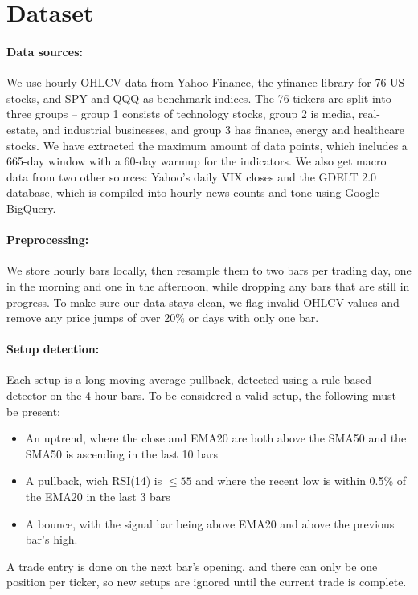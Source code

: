 \documentclass[11pt]{article}
\begin{document}
\section{Dataset}

\paragraph{Data sources:} We use hourly OHLCV data from Yahoo Finance, the yfinance library for 76 US stocks, and SPY and QQQ as benchmark indices. The 76 tickers are split into three groups -- group 1 consists of technology stocks, group 2 is media, real-estate, and industrial businesses, and group 3 has finance, energy and healthcare stocks. We have extracted the maximum amount of data points, which includes a 665-day window with a 60-day warmup for the indicators. We also get macro data from two other sources: Yahoo's daily VIX closes and the GDELT 2.0 database, which is compiled into hourly news counts and tone using Google BigQuery.

\paragraph{Preprocessing:} We store hourly bars locally, then resample them to two bars per trading day, one in the morning and one in the afternoon, while dropping any bars that are still in progress. To make sure our data stays clean, we flag invalid OHLCV values and remove any price jumps of over 20\% or days with only one bar.

\paragraph{Setup detection:} Each setup is a long moving average pullback, detected using a rule-based detector on the 4-hour bars. To be considered a valid setup, the following must be present:
\begin{itemize}
  \item An uptrend, where the close and EMA20 are both above the SMA50 and the SMA50 is ascending in the last 10 bars
  \item A pullback, wich RSI(14) is $\leq 55$ and where the recent low is within 0.5\% of the EMA20 in the last 3 bars
  \item A bounce,  with the signal bar being above EMA20 and above the previous bar's high.
\end{itemize}
A trade entry is done on the next bar's opening, and there can only be one position per ticker, so new setups are ignored until the current trade is complete.
\end{document}
